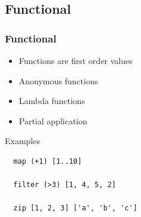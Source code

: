\documentclass{beamer}
\begin{document}
\subsection{Functional}
\begin{frame}[fragile]
\frametitle{Functional}

 \begin{itemize}
  \item Functions are first order values
  \item Anonymous functions
  \item Lambda functions
  \item Partial application
 \end{itemize}

\begin{block}{Examples}

 \begin{lstlisting} 
  map (+1) [1..10]
 
  filter (>3) [1, 4, 5, 2]

  zip [1, 2, 3] ['a', 'b', 'c']
  
 \end{lstlisting}
\end{block}

\end{frame}
\end{document}
